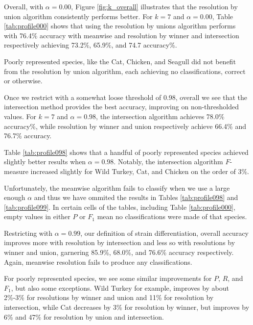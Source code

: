 
Overall, with $\alpha=0.00$, Figure \ref{fig:k_overall} illustrates that the resolution by union algorithm consistently performs better. For $k=7$ and $\alpha = 0.00$, Table \ref{tab:profile000} shows that using the resolution by unions algorithm performs with 76.4\% accuracy with meanwise and resolution by winner and intersection respectively achieving 73.2\%, 65.9\%, and 74.7 accuracy\%.

Poorly represented species, like the Cat, Chicken, and Seagull did not benefit from the resolution by union algorithm, each achieving no classifications, correct or otherwise.


Once we restrict with a somewhat loose threshold of 0.98, overall we see that the intersection method provides the best accuracy, improving on non-thresholded values. For $k=7$ and $\alpha=0.98$, the intersection algorithm achieves 78.0\% accuracy\%, while resolution by winner and union respectively achieve 66.4\% and 76.7\% accuracy.

Table \ref{tab:profile098} shows that a handful of poorly represented species achieved slightly better results when $\alpha=0.98$. Notably, the intersection algorithm $F$-measure increased slightly for Wild Turkey, Cat, and Chicken on the order of 3\%.

Unfortunately, the meanwise algorithm fails to classify when we use a large enough $\alpha$ and thus we have ommited the results in Tables \ref{tab:profile098} and \ref{tab:profile099}. In certain cells of the tables, including Table \ref{tab:profile000}, empty values in either $P$ or $F_1$ mean no classifications were made of that species.




Restricting with $\alpha=0.99$, our definition of strain differentiation, overall accuracy improves more with resolution by intersection and less so with resolutions by winner and union, garnering 85.9\%, 68.0\%, and 76.6\% accuracy respectively. Again, meanwise resolution fails to produce any classifications.

For poorly represented species, we see some similar improvements for $P$, $R$, and $F_1$, but also some exceptions. Wild Turkey for example, improves by about 2\%-3\% for resolutions by winner and union and 11\% for resolution by intersection, while Cat decreases by 3\% for resolution by winner, but improves by 6\% and 47\% for resolution by union and intersection.

